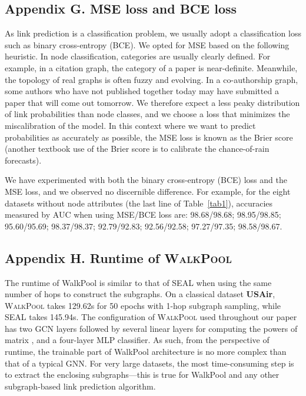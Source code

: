 \documentclass[11pt]{article}
\newcommand{\walkpool}{\textsc{WalkPool}\xspace}
\begin{document}
\subsection*{Appendix G. MSE loss and BCE loss}
As link prediction is a classification problem, we usually adopt a classification loss such as binary cross-entropy (BCE).
We opted for MSE based on the following heuristic. In node classification, categories are usually clearly defined. For example, in a citation graph, the category of a paper is near-definite. Meanwhile, the topology of real graphs is often fuzzy and evolving. In a co-authorship graph, some authors who have not published together today may have submitted a paper that will come out tomorrow. We therefore expect a less peaky distribution of link probabilities than node classes, and we choose a loss that minimizes the miscalibration of the model. In this context where we want to predict probabilities as accurately as possible, the MSE loss is known as the Brier score (another textbook use of the Brier score is to calibrate the chance-of-rain forecasts).

We have experimented with both the binary cross-entropy (BCE) loss and the MSE loss, and we observed no discernible difference. For example, for the eight datasets without node attributes (the last line of Table~\ref{tab1}), accuracies measured by AUC when using MSE/BCE loss are:  98.68/98.68;  98.95/98.85; 95.60/95.69; 98.37/98.37; 92.79/92.83; 92.56/92.58; 97.27/97.35; 98.58/98.67. 

\subsection*{Appendix H. Runtime of \walkpool}
The runtime of WalkPool is similar to that of SEAL when using the same number of hops to construct the subgraphs. On a classical dataset \textbf{USAir}, \walkpool takes 129.62s for 50 epochs with 1-hop subgraph sampling, while SEAL takes 145.94s. The configuration of \walkpool used throughout our paper has two GCN layers followed by several linear layers for computing the powers of matrix , and a four-layer MLP classifier. As such, from the perspective of runtime, the trainable part of WalkPool architecture is no more complex than that of a typical GNN. For very large datasets, the most time-consuming step is to extract the enclosing subgraphs---this is true for WalkPool and any other subgraph-based link prediction algorithm.
\end{document}
